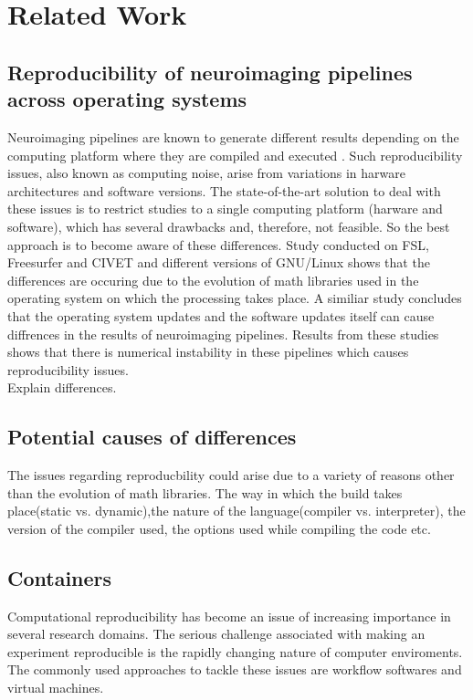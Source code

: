 \chapter{Related Work}

\section{Reproducibility of neuroimaging pipelines across operating systems}
Neuroimaging pipelines are known to generate different results depending on the computing platform where they are compiled and executed \cite{Gla15}. Such reproducibility issues, also known as computing noise, arise from variations in harware architectures and software versions. The state-of-the-art solution to deal with these issues is to restrict studies to a single computing platform (harware and software), which has several drawbacks and, therefore, not feasible. So the best approach is to become aware of these differences.
Study conducted on FSL, Freesurfer and CIVET and different versions of GNU/Linux \cite{Gla15} shows that the differences are occuring due to the evolution of math libraries used in the operating system on which the processing takes place. A similiar study \cite{10.1371/journal.pone.0038234} concludes that the operating system updates and the software updates itself can cause diffrences in the results of neuroimaging pipelines. Results from these studies shows that there is numerical instability in these pipelines which causes reproducibility issues.\\

Explain differences.\\

\section{Potential causes of differences}
The issues regarding reproducbility could arise due to a variety of reasons other than the evolution of math libraries. The way in which the build takes place(static vs. dynamic),the nature of the language(compiler vs. interpreter), the version of the compiler used, the options used while compiling the code etc.\\ 

\section{Containers}
Computational reproducibility has become an issue of increasing importance in several research domains.	The serious challenge associated with making an experiment reproducible is the rapidly changing nature of computer enviroments. The commonly used approaches to tackle these issues are workflow softwares and virtual machines.\\

